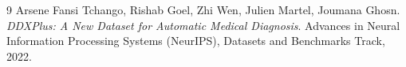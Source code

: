 \documentclass[11pt,a4paper]{article}
\begin{document}
\begin{thebibliography}{9}
Arsene Fansi Tchango, Rishab Goel, Zhi Wen, Julien Martel, Joumana Ghosn.
\emph{DDXPlus: A New Dataset for Automatic Medical Diagnosis}.
Advances in Neural Information Processing Systems (NeurIPS), Datasets and
Benchmarks Track, 2022.
\end{thebibliography}
\end{document}
